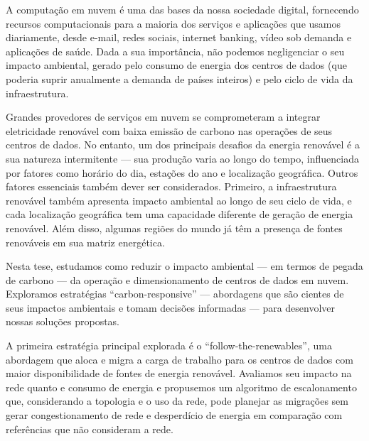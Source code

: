 
A computação em nuvem é uma das bases da nossa sociedade digital, fornecendo recursos computacionais para a maioria dos serviços e aplicações que usamos diariamente, desde e-mail, redes sociais, internet banking, vídeo sob demanda e aplicações de saúde. Dada a sua importância, não podemos negligenciar o seu impacto ambiental, gerado pelo consumo de energia dos centros de dados (que poderia suprir anualmente a demanda de países inteiros) e pelo ciclo de vida da infraestrutura.


Grandes provedores de serviços em nuvem se comprometeram a integrar eletricidade renovável com baixa emissão de carbono nas operações de seus centros de dados. No entanto, um dos principais desafios da energia renovável é a sua natureza intermitente --- sua produção varia ao longo do tempo, influenciada por fatores como horário do dia, estações do ano e localização geográfica. Outros fatores essenciais também dever ser considerados. Primeiro, a infraestrutura renovável também apresenta impacto ambiental ao longo de seu ciclo de vida, e cada localização geográfica tem uma capacidade diferente de geração de energia renovável. Além disso, algumas regiões do mundo já têm a presença de fontes renováveis em sua matriz energética.


Nesta tese, estudamos como reduzir o impacto ambiental --- em termos de pegada de carbono --- da operação e dimensionamento de centros de dados em nuvem. Exploramos estratégias ``carbon-responsive'' --- abordagens que são cientes de seus impactos ambientais e tomam decisões informadas --- para desenvolver nossas soluções propostas.

A primeira estratégia principal explorada é o ``follow-the-renewables'', uma abordagem que aloca e migra a carga de trabalho para os centros de dados com maior disponibilidade de fontes de energia renovável. Avaliamos seu impacto na rede quanto e consumo de energia e propusemos um algoritmo de escalonamento que, considerando a topologia  e o uso da rede, pode planejar as migrações sem gerar congestionamento de rede e desperdício de energia em comparação com referências que não consideram a rede.

